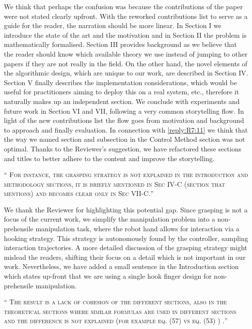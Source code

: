 \documentclass[10pt]{article}
\newcommand{\referee}[1]{\;
  \begin{minipage}[t]{.95\textwidth}
    ``{\small\color{red} \textsc{#1}}''
  \end{minipage}\medskip
  }
\begin{document}
\begin{enumerate}[label={[R7:\,\arabic{enumi}]}]
We think that perhaps the confusion was because the contributions of the paper were not stated clearly upfront. With the reworked contributions list to serve as a guide for the reader, the narration should be more linear. In Section I we introduce the state of the art and the motivation and in Section II the problem is mathematically formalised. Section III provides background as we believe that the reader should know which available theory we use instead of jumping to other papers if they are not really in the field. On the other hand, the novel elements of the algorithmic design, which are unique to our work, are described in Section IV. Section V finally describes the implementation considerations, which would be useful for practitioners aiming to deploy this on a real system, etc., therefore it naturally makes up an independent section. We conclude with experiments and future work in Section VI and VII, following a very common storytelling flow. In light of the new contributions list the flow goes from motivation and background to approach and finally evaluation. In connection with \ref{reply:R7:11} we think that the way we named section and subsection in the Control Method section was not optimal. Thanks to the Reviewer's suggestion, we have refactored these sections and titles to better adhere to the content and improve the storytelling.


\item\label{reply:R7:9} 
\referee{For instance, the grasping strategy is not explained  in the introduction and methodology sections, it is briefly mentioned in Sec IV-C (section that mentions) and becomes clear only in Sec VII-C.}

We thank the Reviewer for highlighting this potential gap. Since grasping is not a focus of the current work, we simplify the manipulation problem into a non-prehensile manipulation task, where the robot hand allows for interaction via a hooking strategy. This strategy is autonomously found by the controller, sampling interaction trajectories. A more detailed discussion of the grasping strategy might mislead the readers, shifting their focus on a detail which is not important in our work. Nevertheless, we have added a small sentence in the Introduction section which states up-front that we are using a single hook finger design for non-prehensile manipulation.

\item\label{reply:R7:10} 
\referee{The result is a lack of cohesion of the different sections, also in the theoretical sections where similar formulas are used in different sections and the difference is not explained (for example eq. (57) vs eq. (53) ) .}


\end{enumerate}
\end{document}
